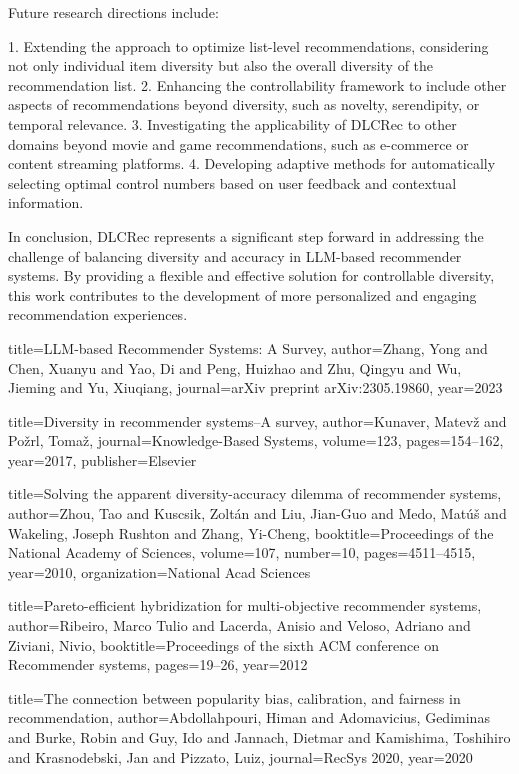 \documentclass[12pt,letterpaper]{article}
\begin{document}
Future research directions include:

1. Extending the approach to optimize list-level recommendations, considering not only individual item diversity but also the overall diversity of the recommendation list.
2. Enhancing the controllability framework to include other aspects of recommendations beyond diversity, such as novelty, serendipity, or temporal relevance.
3. Investigating the applicability of DLCRec to other domains beyond movie and game recommendations, such as e-commerce or content streaming platforms.
4. Developing adaptive methods for automatically selecting optimal control numbers based on user feedback and contextual information.

In conclusion, DLCRec represents a significant step forward in addressing the challenge of balancing diversity and accuracy in LLM-based recommender systems. By providing a flexible and effective solution for controllable diversity, this work contributes to the development of more personalized and engaging recommendation experiences.


\begin{thebibliography}{99}

title={LLM-based Recommender Systems: A Survey},
  author={Zhang, Yong and Chen, Xuanyu and Yao, Di and Peng, Huizhao and Zhu, Qingyu and Wu, Jieming and Yu, Xiuqiang},
  journal={arXiv preprint arXiv:2305.19860},
  year={2023}


title={Diversity in recommender systems--A survey},
  author={Kunaver, Matev{\v{z}} and Po{\v{z}}rl, Toma{\v{z}}},
  journal={Knowledge-Based Systems},
  volume={123},
  pages={154--162},
  year={2017},
  publisher={Elsevier}


title={Solving the apparent diversity-accuracy dilemma of recommender systems},
  author={Zhou, Tao and Kuscsik, Zolt{\'{a}}n and Liu, Jian-Guo and Medo, Mat{\'{u}}{\v{s}} and Wakeling, Joseph Rushton and Zhang, Yi-Cheng},
  booktitle={Proceedings of the National Academy of Sciences},
  volume={107},
  number={10},
  pages={4511--4515},
  year={2010},
  organization={National Acad Sciences}


title={Pareto-efficient hybridization for multi-objective recommender systems},
  author={Ribeiro, Marco Tulio and Lacerda, Anisio and Veloso, Adriano and Ziviani, Nivio},
  booktitle={Proceedings of the sixth ACM conference on Recommender systems},
  pages={19--26},
  year={2012}


title={The connection between popularity bias, calibration, and fairness in recommendation},
  author={Abdollahpouri, Himan and Adomavicius, Gediminas and Burke, Robin and Guy, Ido and Jannach, Dietmar and Kamishima, Toshihiro and Krasnodebski, Jan and Pizzato, Luiz},
  journal={RecSys 2020},
  year={2020}


\end{thebibliography}
\end{document}

